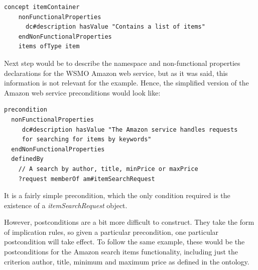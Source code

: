 \documentclass{fast_latex}
\begin{document}
\singlespacing
\begin{small}
\begin{verbatim}
concept itemContainer
    nonFunctionalProperties
      dc#description hasValue "Contains a list of items"
    endNonFunctionalProperties
    items ofType item
\end{verbatim}
\end{small}
\doublespacing

Next step would be to describe the namespace and non-functional properties declarations for the WSMO Amazon web service, but as it was said, this information is not relevant for the example. Hence, the simplified version of the Amazon web service preconditions would look like:

\singlespacing
\begin{small}
\begin{verbatim}
precondition
  nonFunctionalProperties
     dc#description hasValue "The Amazon service handles requests 
     for searching for items by keywords"
  endNonFunctionalProperties
  definedBy
    // A search by author, title, minPrice or maxPrice
    ?request memberOf am#itemSearchRequest
\end{verbatim}
\end{small}
\doublespacing

It is a fairly simple precondition, which the only condition required is the existence of a \emph{itemSearchRequest} object.

However, postconditions are a bit more difficult to construct. They take the form of implication rules, so given a particular precondition, one particular postcondition will take effect. To follow the same example, these would be the postconditions for the Amazon search items functionality, including just the criterion author, title, minimum and maximum price as defined in the ontology.
\end{document}
